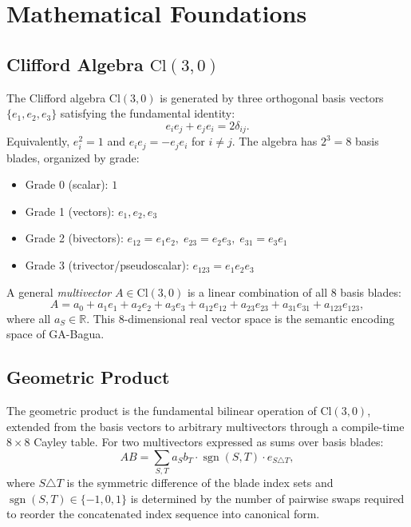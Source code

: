 \documentclass[11pt,a4paper]{article}
\newcommand{\Cl}{\mathrm{Cl}}
\newcommand{\R}{\mathbb{R}}
\begin{document}
\section{Mathematical Foundations}

\subsection{Clifford Algebra $\Cl(3,0)$}

The Clifford algebra $\Cl(3,0)$ is generated by three orthogonal basis
vectors $\{e_1, e_2, e_3\}$ satisfying the fundamental identity:
\begin{equation}
  e_i e_j + e_j e_i = 2\delta_{ij}.
\end{equation}
Equivalently, $e_i^2 = 1$ and $e_i e_j = -e_j e_i$ for $i \neq j$. The
algebra has $2^3 = 8$ basis blades, organized by grade:

\begin{itemize}[nosep]
\item Grade 0 (scalar): $1$
\item Grade 1 (vectors): $e_1, e_2, e_3$
\item Grade 2 (bivectors): $e_{12} = e_1 e_2,\; e_{23} = e_2 e_3,\; e_{31} = e_3 e_1$
\item Grade 3 (trivector/pseudoscalar): $e_{123} = e_1 e_2 e_3$
\end{itemize}

A general \emph{multivector} $A \in \Cl(3,0)$ is a linear combination of all
8 basis blades:
\begin{equation}
  A = a_0 + a_1 e_1 + a_2 e_2 + a_3 e_3
    + a_{12} e_{12} + a_{23} e_{23} + a_{31} e_{31}
    + a_{123} e_{123},
\end{equation}
where all $a_S \in \R$. This 8-dimensional real vector space is the
semantic encoding space of GA-Bagua.

\subsection{Geometric Product}

The geometric product is the fundamental bilinear operation of $\Cl(3,0)$,
extended from the basis vectors to arbitrary multivectors through a
compile-time $8 \times 8$ Cayley table. For two multivectors expressed as
sums over basis blades:
\begin{equation}
  AB = \sum_{S,T} a_S b_T \cdot \operatorname{sgn}(S, T) \cdot e_{S \triangle T},
\end{equation}
where $S \triangle T$ is the symmetric difference of the blade index sets and
$\operatorname{sgn}(S,T) \in \{-1, 0, 1\}$ is determined by the number of
pairwise swaps required to reorder the concatenated index sequence into
canonical form.
\end{document}
